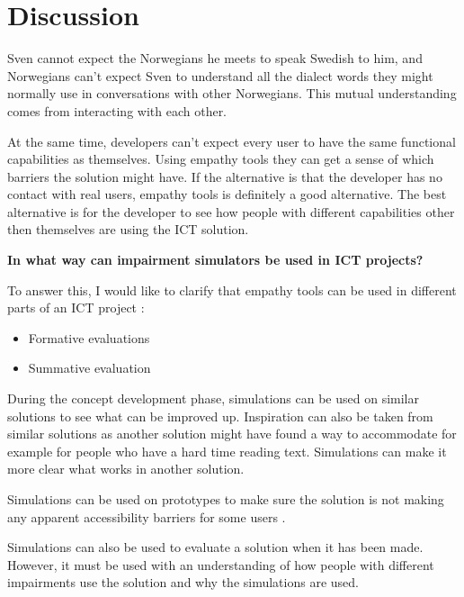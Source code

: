 \chapter{Discussion}
Sven cannot expect the Norwegians he meets to speak Swedish to him, and Norwegians can't expect Sven to understand all the dialect words they might normally use in conversations with other Norwegians. This mutual understanding comes from interacting with each other.

At the same time, developers can't expect every user to have the same functional capabilities as themselves. Using empathy tools they can get a sense of which barriers the solution might have. If the alternative is that the developer has no contact with real users, empathy tools is definitely a good alternative. The best alternative is for the developer to see how people with different capabilities other then themselves are using the ICT solution.


\textbf{In what way can impairment simulators be used in ICT projects?}

To answer this, I would like to clarify that empathy tools can be used in different parts of an ICT project \parencite{Keates2014}:
\begin{itemize}
    \item Formative evaluations
    \item Summative evaluation
\end{itemize}
During the concept development phase, simulations can be used on similar solutions to see what can be improved up. Inspiration can also be taken from similar solutions as another solution might have found a way to accommodate for example for people who have a hard time reading text. Simulations can make it more clear what works in another solution.
    
Simulations can be used on prototypes to make sure the solution is not making any apparent accessibility barriers for some users \parencite{Keates2014}.

Simulations can also be used to evaluate a solution when it has been made. However, it must be used with an understanding of how people with different impairments use the solution and why the simulations are used.  


